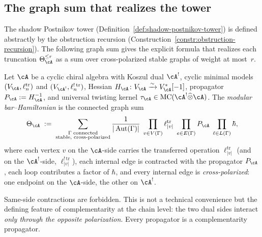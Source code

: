\subsection{The graph sum that realizes the tower}
\label{subsec:modular-bar-hamiltonian}

The shadow Postnikov tower
(Definition~\ref{def:shadow-postnikov-tower}) is defined
abstractly by the obstruction recursion
(Construction~\ref{constr:obstruction-recursion}).
The following graph sum gives the explicit formula that realizes
each truncation $\Theta_\cA^{\leq r}$ as a sum over
cross-polarized stable graphs of weight at most~$r$.

\begin{definition}
\label{def:modular-bar-hamiltonian}
Let $\cA$ be a cyclic chiral algebra with Koszul dual $\cA^!$,
cyclic minimal models $(V_{\cA}, \ell_n^{\mathrm{tr}})$ and
$(V_{\cA^!}, \ell_n^{!\,\mathrm{tr}})$, Hessian
$H_{\cA}\colon V_{\cA} \xrightarrow{\sim} V_{\cA}^*[-1]$,
propagator $P_{\cA} := H_{\cA}^{-1}$, and universal twisting
kernel $\tau_{\cA} \in \operatorname{MC}(\cA^!\widehat\otimes\cA)$.
The \emph{modular bar--Hamiltonian} is the connected graph sum
\begin{equation}
\label{eq:modular-bar-hamiltonian}
\Theta_{\cA}
\;:=\;
\sum_{\substack{
\Gamma\;\text{connected}\\
\text{stable, cross-polarized}}}
\frac{1}{|\operatorname{Aut}(\Gamma)|}
\;\prod_{v \in V(\Gamma)}
\ell_{|v|}^{\mathrm{tr}}
\;\prod_{e \in E(\Gamma)} P_{\cA}
\;\prod_{\ell \in L(\Gamma)} \hbar,
\end{equation}
where each vertex $v$ on the $\cA$-side carries the transferred
operation $\ell_{|v|}^{\mathrm{tr}}$ (and on the $\cA^!$-side,
$\ell_{|v|}^{!\,\mathrm{tr}}$), each internal edge is contracted
with the propagator $P_{\cA}$, each loop contributes a factor
of $\hbar$, and every internal edge is \emph{cross-polarized}:
one endpoint on the $\cA$-side, the other on $\cA^!$.
\end{definition}

\begin{remark}
\label{rem:cross-polarization}
Same-side contractions are forbidden.  This is not a technical
convenience but the defining feature of complementarity at the
chain level: the two dual sides interact \emph{only through the
opposite polarization}.  Every propagator is a complementarity
propagator.
\end{remark}

